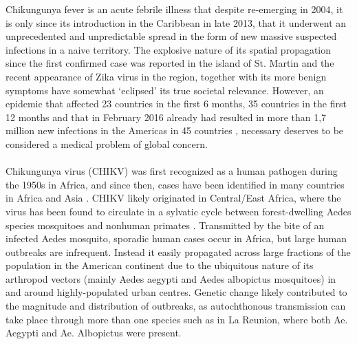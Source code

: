 \documentclass[10pt,a4paper]{article}
\begin{document}
Chikungunya fever is an acute febrile illness that despite re-emerging in 2004, it is only since its introduction in the Caribbean in late 2013, that it underwent an unprecedented and unpredictable spread in the form of new massive suspected infections in a naive territory. The explosive nature of its spatial propagation since the first confirmed case was reported in the island of St. Martin and the recent appearance of Zika virus in the region, together with its more benign symptoms have somewhat `eclipsed' its true societal relevance. However, an epidemic that affected 23 countries in the first 6 months, 35 countries in the first 12 months \citep{carpha:2014} and that in February 2016 already had resulted in more than 1,7 million new infections in the Americas in 45 countries \citep{carpha:2016}, necessary deserves to be considered a medical problem of global concern.
\\\\
Chikungunya virus (CHIKV) was first recognized as a human pathogen during the 1950s in Africa, and since then, cases have been identified in many countries in Africa and Asia \citep{robinson1955epidemic, jupp1988chikungunya}. CHIKV likely originated in Central/East Africa, where the virus has been found to circulate in a sylvatic cycle between forest-dwelling Aedes species mosquitoes and nonhuman primates \citep{powers2000re}. Transmitted by the bite of an infected Aedes mosquito, sporadic human cases occur in Africa, but large human outbreaks are infrequent. Instead it easily propagated across large fractions of the population in the American continent due to the ubiquitous nature of its arthropod vectors (mainly Aedes aegypti and Aedes albopictus mosquitoes) in and around highly-populated urban centres. Genetic change likely contributed to the magnitude and distribution of outbreaks, as autochthonous transmission can take place through more than one species such as in La Reunion, where both Ae. Aegypti and Ae. Albopictus were present\citep{tsetsarkin2007single, vazeille2007two}.
%
\\\\
\end{document}
